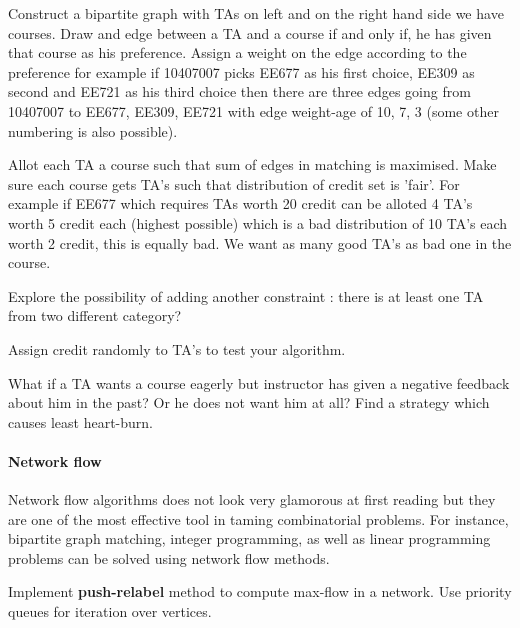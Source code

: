   Construct a bipartite graph with TAs on left and on the right hand side we
  have courses. Draw and edge between a TA and a course if and only if, he has
  given that course as his preference. Assign a weight on the edge according to
  the preference for example if 10407007 picks EE677 as his first choice, EE309
  as second and EE721 as his third choice then there are three edges going from
  10407007 to EE677, EE309, EE721 with edge weight-age of 10, 7, 3 (some other
  numbering is also possible).

\begin{problem}[45]
  Allot each TA a course such that sum of edges in matching is maximised. Make
  sure each course gets TA's such that distribution of credit set is 'fair'. For
  example if EE677 which requires TAs worth 20 credit can be alloted 4 TA's
  worth 5 credit each (highest possible) which is a bad distribution of 10 TA's
  each worth 2 credit, this is equally bad. We want as many good TA's as bad one
  in the course.

  Explore the possibility of adding another constraint : there is at least one
  TA from two different category?

  Assign credit randomly to TA's to test your algorithm. 

  What if a TA wants a course eagerly but instructor has given a negative
  feedback about him in the past? Or he does not want him at all? Find a
  strategy which causes least heart-burn.
  \end{problem}

\paragraph{Network flow}

  Network flow algorithms does not look very glamorous at first reading but they
  are one of the most effective tool in taming combinatorial problems. For
  instance, bipartite graph matching, integer programming, as well as linear
  programming problems can be solved using network flow methods.

  \begin{problem}[35]  
 
    Implement \textbf{push-relabel} method to compute max-flow in a network. Use
    priority queues for iteration over vertices.
  
  \end{problem}

